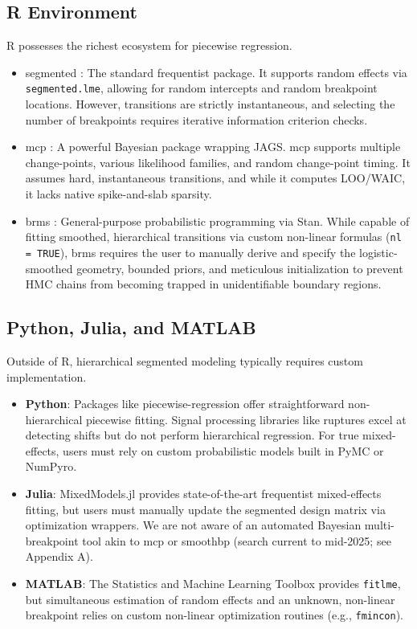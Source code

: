 \documentclass[12pt]{article}
\newcommand{\pkg}[1]{\textsf{#1}}
\newcommand{\code}[1]{\texttt{#1}}
\begin{document}
\subsection{R Environment}
R possesses the richest ecosystem for piecewise regression.
\begin{itemize}
    \item \pkg{segmented} \citep{muggeo2003}: The standard frequentist package. It supports random effects via \code{segmented.lme}, allowing for random intercepts and random breakpoint locations. However, transitions are strictly instantaneous, and selecting the number of breakpoints requires iterative information criterion checks.
    \item \pkg{mcp} \citep{lindelov2020}: A powerful Bayesian package wrapping JAGS. \pkg{mcp} supports multiple change-points, various likelihood families, and random change-point timing. It assumes hard, instantaneous transitions, and while it computes LOO/WAIC, it lacks native spike-and-slab sparsity.
    \item \pkg{brms} \citep{burkner2017}: General-purpose probabilistic programming via Stan. While capable of fitting smoothed, hierarchical transitions via custom non-linear formulas (\code{nl = TRUE}), \pkg{brms} requires the user to manually derive and specify the logistic-smoothed geometry, bounded priors, and meticulous initialization to prevent HMC chains from becoming trapped in unidentifiable boundary regions.
\end{itemize}

\subsection{Python, Julia, and MATLAB}
Outside of R, hierarchical segmented modeling typically requires custom implementation.
\begin{itemize}
    \item \textbf{Python}: Packages like \pkg{piecewise-regression} offer straightforward non-hierarchical piecewise fitting. Signal processing libraries like \pkg{ruptures} excel at detecting shifts but do not perform hierarchical regression. For true mixed-effects, users must rely on custom probabilistic models built in \pkg{PyMC} or \pkg{NumPyro}.
    \item \textbf{Julia}: \pkg{MixedModels.jl} provides state-of-the-art frequentist mixed-effects fitting, but users must manually update the segmented design matrix via optimization wrappers. We are not aware of an automated Bayesian multi-breakpoint tool akin to \pkg{mcp} or \pkg{smoothbp} (search current to mid-2025; see Appendix A).
    \item \textbf{MATLAB}: The Statistics and Machine Learning Toolbox provides \code{fitlme}, but simultaneous estimation of random effects and an unknown, non-linear breakpoint relies on custom non-linear optimization routines (e.g., \code{fmincon}).
\end{itemize}
\end{document}
